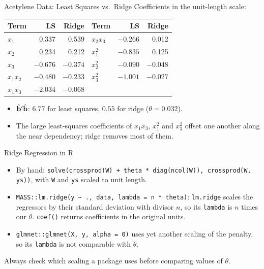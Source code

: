 \begin{frame}{Acetylene Data: Least Squares vs.\ Ridge}
    Coefficients in the unit-length scale:
    \begin{center}
        \small
        \begin{tabular}{lrr@{\qquad}lrr}
            \toprule
            Term & LS & Ridge & Term & LS & Ridge \\
            \midrule
            $x_1$ & 0.337 & 0.539 & $x_2x_3$ & $-0.266$ & 0.012 \\
            $x_2$ & 0.234 & 0.212 & $x_1^2$ & $-0.835$ & 0.125 \\
            $x_3$ & $-0.676$ & $-0.374$ & $x_2^2$ & $-0.090$ & $-0.048$ \\
            $x_1x_2$ & $-0.480$ & $-0.233$ & $x_3^2$ & $-1.001$ & $-0.027$ \\
            $x_1x_3$ & $-2.034$ & $-0.068$ & & & \\
            \bottomrule
        \end{tabular}
    \end{center}
    \begin{itemize}
        \item $\hat{\mathbf{b}}'\hat{\mathbf{b}}$: $6.77$ for least squares, $0.55$ for ridge ($\theta=0.032$).
        \item The large least-squares coefficients of $x_1x_3$, $x_1^2$ and $x_3^2$ offset one another along the near dependency; ridge removes most of them.
    \end{itemize}
\end{frame}


\begin{frame}{Ridge Regression in R}
    \begin{itemize}
        \item By hand: \texttt{solve(crossprod(W) + theta * diag(ncol(W)), crossprod(W, ys))}, with \texttt{W} and \texttt{ys} scaled to unit length.
        \item \texttt{MASS::lm.ridge(y \textasciitilde{} ., data, lambda = n * theta)}: \texttt{lm.ridge} scales the regressors by their standard deviation with divisor $n$, so its \texttt{lambda} is $n$ times our $\theta$. \texttt{coef()} returns coefficients in the original units.
        \item \texttt{glmnet::glmnet(X, y, alpha = 0)} uses yet another scaling of the penalty, so its \texttt{lambda} is not comparable with $\theta$.
    \end{itemize}
    \svspace{0.5em}
    Always check which scaling a package uses before comparing values of $\theta$.
\end{frame}



